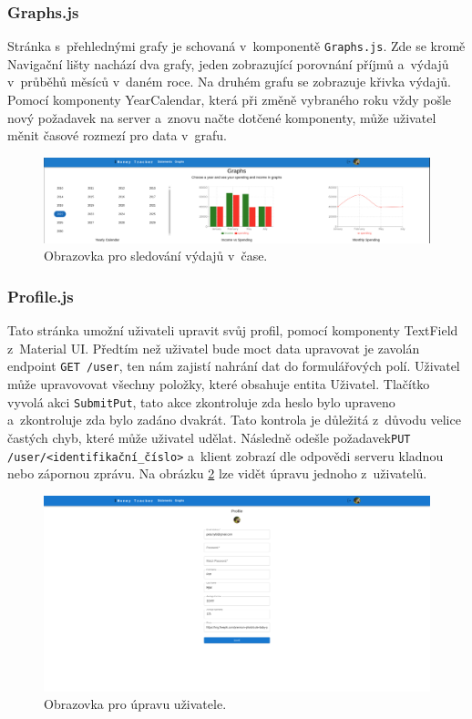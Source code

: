 \subsubsection{Graphs.js}
Stránka s~přehlednými grafy je schovaná v~komponentě \texttt{Graphs.js}. Zde se kromě Navigační lišty nachází dva grafy, jeden zobrazující porovnání příjmů a~výdajů v~průběhů měsíců v~daném roce. Na druhém grafu se zobrazuje křivka výdajů. Pomocí komponenty YearCalendar, která při změně vybraného roku vždy pošle nový požadavek na server a~znovu načte dotčené komponenty, může uživatel měnit časové rozmezí pro data v~grafu.
\begin{figure}[H]
    \centering
    \includegraphics[width=\textwidth]{obrazky-figures/moneygraphs.pdf}
    \caption{Obrazovka pro sledování výdajů v~čase.}
    \label{fig:graphs}
\end{figure}


\subsubsection{Profile.js}
Tato stránka umožní uživateli upravit svůj profil, pomocí komponenty TextField z~Material UI. Předtím než uživatel bude moct data upravovat je zavolán endpoint \texttt{GET /user}, ten nám zajistí nahrání dat do formulářových polí. Uživatel může upravovovat všechny položky, které obsahuje entita Uživatel. Tlačítko vyvolá akci \texttt{SubmitPut}, tato akce zkontroluje zda heslo bylo upraveno a~zkontroluje zda bylo zadáno dvakrát. Tato kontrola je důležitá z~důvodu velice častých chyb, které může uživatel udělat. Následně odešle požadavek\break \texttt{PUT /user/<identifikační\_číslo>} a~klient zobrazí dle odpovědi serveru kladnou nebo zápornou zprávu. Na obrázku \ref{fig:profile} lze vidět úpravu jednoho z~uživatelů.

\begin{figure}[H]
    \centering
    \includegraphics[width=\textwidth]{obrazky-figures/moneyprofile.png}
    \caption{Obrazovka pro úpravu uživatele.}
    \label{fig:profile}
\end{figure}

